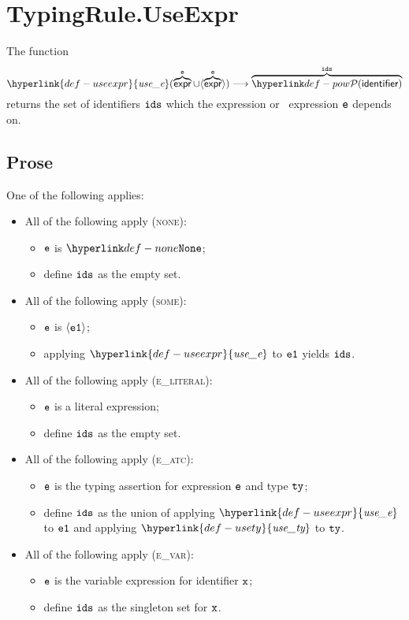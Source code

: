 \documentclass{book}
\newcommand\usety[0]{\hyperlink{def-usety}{\textfunc{use\_ty}}}
\newcommand\useexpr[0]{\hyperlink{def-useexpr}{\textfunc{use\_e}}}
\begin{document}
\section{TypingRule.UseExpr \label{sec:TypingRule.UseExpr}}
\hypertarget{def-useexpr}{}
The function
\[
\useexpr(\overname{\expr}{\ve} \cup \langle\overname{\expr}{\ve}\rangle) \aslto \overname{\pow{\identifier}}{\ids}
\]
returns the set of identifiers $\texttt{ids}$ which the expression or \optional\ expression $\texttt{e}$ depends on.

\subsection{Prose}
One of the following applies:
\begin{itemize}
  \item All of the following apply (\textsc{none}):
  \begin{itemize}
    \item $\texttt{e}$ is $\None$;
    \item define $\texttt{ids}$ as the empty set.
  \end{itemize}

  \item All of the following apply (\textsc{some}):
  \begin{itemize}
    \item $\texttt{e}$ is $\langle\texttt{e1}\rangle$;
    \item applying $\useexpr$ to $\texttt{e1}$ yields $\texttt{ids}$.
  \end{itemize}

  \item All of the following apply (\textsc{e\_literal}):
  \begin{itemize}
    \item $\texttt{e}$ is a literal expression;
    \item define $\texttt{ids}$ as the empty set.
  \end{itemize}

  \item All of the following apply (\textsc{e\_atc}):
  \begin{itemize}
    \item $\texttt{e}$ is the typing assertion for expression $\texttt{e}$ and type $\texttt{ty}$;
    \item define $\texttt{ids}$ as the union of applying $\useexpr$ to $\texttt{e1}$ and applying $\usety$ to $\texttt{ty}$.
  \end{itemize}

  \item All of the following apply (\textsc{e\_var}):
  \begin{itemize}
    \item $\texttt{e}$ is the variable expression for identifier $\texttt{x}$;
    \item define $\texttt{ids}$ as the singleton set for $\texttt{x}$.
  \end{itemize}


\end{itemize}
\end{document}
